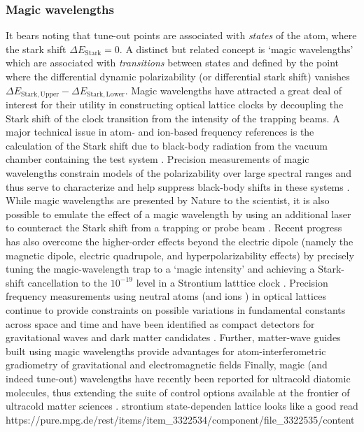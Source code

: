 \subsubsection{Magic wavelengths}
	It bears noting that tune-out points are associated with \emph{states} of the atom, where the stark shift $\Delta E_\mathrm{Stark} =0$.
	A distinct but related concept is `magic wavelengths' which are associated with \emph{transitions} between states and defined by the point where the differential dynamic polarizability (or differential stark shift) vanishes $\Delta E_\mathrm{Stark,Upper}-\Delta E_\mathrm{Stark,Lower}$. 
	Magic wavelengths have attracted a great deal of interest for their utility in constructing optical lattice clocks \cite{Takamoto05,Derevianko11} by decoupling the Stark shift of the clock transition from the intensity of the trapping beams.
	A major technical issue in atom- and ion-based frequency references is the calculation of the Stark shift due to black-body radiation from the vacuum chamber containing the test system \cite{Fasano21}.
	Precision measurements of magic wavelengths constrain models of the polarizability over large spectral ranges and thus serve to characterize and help suppress black-body shifts in these systems \cite{Chanu20,Fasano21}.			
	While magic wavelengths are presented by Nature to the scientist, it is also possible to emulate the effect of a magic wavelength by using an additional laser to counteract the Stark shift from a trapping or probe beam \cite{Hilton19}.
	Recent progress has also overcome the higher-order effects beyond the electric dipole (namely the magnetic dipole, electric quadrupole, and hyperpolarizability effects) by precisely tuning the magic-wavelength trap to a `magic intensity' and achieving a Stark-shift cancellation to the $10^{-19}$  level in a Strontium latttice clock \cite{Ushijima18}.
	Precision frequency measurements using neutral atoms (and ions \cite{Chanu20}) in optical lattices continue to provide constraints on possible variations in fundamental constants across space and time \cite{Uzan03,Blatt08,Huntemann14} and have been identified as compact detectors for gravitational waves \cite{Kolkowitz16} and dark matter candidates \cite{Derevianko14}.
	Further, matter-wave guides built using magic wavelengths provide advantages for atom-interferometric gradiometry of gravitational and electromagnetic fields \cite{Akatsuka17}
	Finally, magic (and indeed tune-out) wavelengths have recently been reported for ultracold diatomic molecules, thus extending the suite of control options available at the frontier of ultracold matter sciences \cite{Bause20}.
		strontium state-dependen lattice
		looks like a good read
		https://pure.mpg.de/rest/items/item_3322534/component/file_3322535/content 

